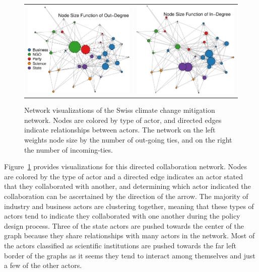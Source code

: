 \documentclass[12pt,pdflatex]{elsarticle}
\begin{document}
\begin{figure}[ht]
	\centering
	\begin{tabular}{cc}
	\includegraphics[width=.47\textwidth]{dvNet_outDegree} & 
	\includegraphics[width=.44\textwidth]{dvNet_inDegree}
	\end{tabular}
	\caption{Network visualizations of the Swiss climate change mitigation network. Nodes are colored by type of actor, and directed edges indicate relationships between actors. The network on the left weights node size by the number of out-going ties, and on the right the number of incoming-ties.}
	\label{fig:dvNet}
\end{figure}
\FloatBarrier

Figure~\ref{fig:dvNet} provides visualizations for this directed collaboration network. Nodes are colored by the type of actor and a directed edge indicates an actor stated that they collaborated with another, and determining which actor indicated the collaboration can be ascertained by the direction of the arrow. 
The majority of industry and business actors are clustering together, meaning that these types of actors tend to indicate they collaborated with one another during the policy design process. Three of the state actors are pushed towards the center of the graph because they share relationships with many actors in the network. Most of the actors classified as scientific institutions are pushed towards the far left border of the graphs as it seems they tend to interact among themselves and just a few of the other actors. 
\end{document}
